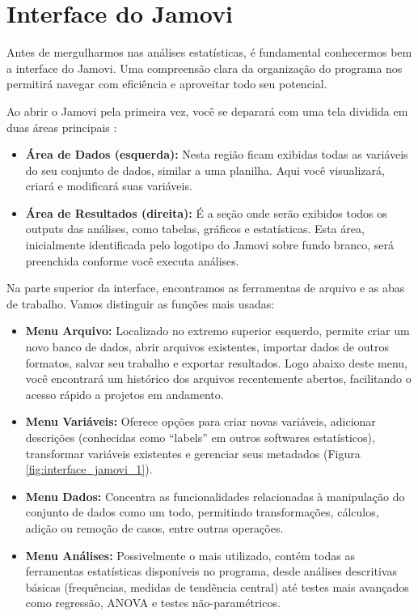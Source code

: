 \section{Interface do Jamovi}

Antes de mergulharmos nas análises estatísticas, é fundamental conhecermos bem a interface do Jamovi. Uma compreensão clara da organização do programa nos permitirá navegar com eficiência e aproveitar todo seu potencial.

Ao abrir o Jamovi pela primeira vez, você se deparará com uma tela dividida em duas áreas principais :

\begin{itemize}
    \item \textbf{Área de Dados (esquerda):} Nesta região ficam exibidas todas as variáveis do seu conjunto de dados, similar a uma planilha. Aqui você visualizará, criará e modificará suas variáveis.

    \item \textbf{Área de Resultados (direita):} É a seção onde serão exibidos todos os outputs das análises, como tabelas, gráficos e estatísticas. Esta área, inicialmente identificada pelo logotipo do Jamovi sobre fundo branco, será preenchida conforme você executa análises.
\end{itemize}

Na parte superior da interface, encontramos as ferramentas de arquivo e as abas de trabalho. Vamos distinguir as funções mais usadas:

\begin{itemize}
    \item \textbf{Menu Arquivo:} Localizado no extremo superior esquerdo, permite criar um novo banco de dados, abrir arquivos existentes, importar dados de outros formatos, salvar seu trabalho e exportar resultados. Logo abaixo deste menu, você encontrará um histórico dos arquivos recentemente abertos, facilitando o acesso rápido a projetos em andamento.

    \item \textbf{Menu Variáveis:} Oferece opções para criar novas variáveis, adicionar descrições (conhecidas como ``labels'' em outros softwares estatísticos), transformar variáveis existentes e gerenciar seus metadados (Figura \ref{fig:interface_jamovi_1}).

    \item \textbf{Menu Dados:} Concentra as funcionalidades relacionadas à manipulação do conjunto de dados como um todo, permitindo transformações, cálculos, adição ou remoção de casos, entre outras operações.

    \item \textbf{Menu Análises:} Possivelmente o mais utilizado, contém todas as ferramentas estatísticas disponíveis no programa, desde análises descritivas básicas (frequências, medidas de tendência central) até testes mais avançados como regressão, ANOVA e testes não-paramétricos.
\end{itemize}

